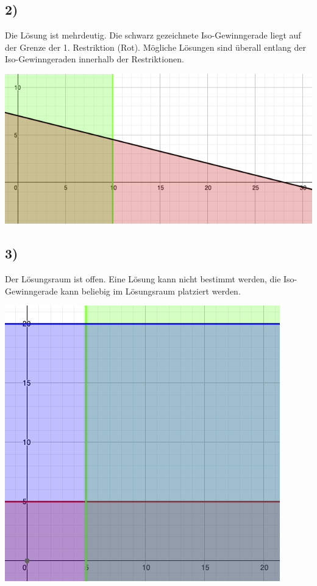 \documentclass[a4paper,11pt]{article}
\begin{document}
\subsection*{2)}
Die Lösung ist mehrdeutig. Die schwarz gezeichnete Iso-Gewinngerade liegt auf der Grenze der 1. Restriktion (Rot). Mögliche Lösungen sind überall entlang der Iso-Gewinngeraden innerhalb der Restriktionen. \newline

\begin{centering}
	\includegraphics[width=.7\linewidth]{src/a2_2.png}
\end{centering}

\subsection*{3)}
Der Lösungsraum ist offen. Eine Lösung kann nicht bestimmt werden, die Iso-Gewinngerade kann beliebig im Lösungsraum platziert werden. \newline

\begin{centering}
	\includegraphics[width=.7\linewidth]{src/a2_3.png}
\end{centering}
\end{document}
